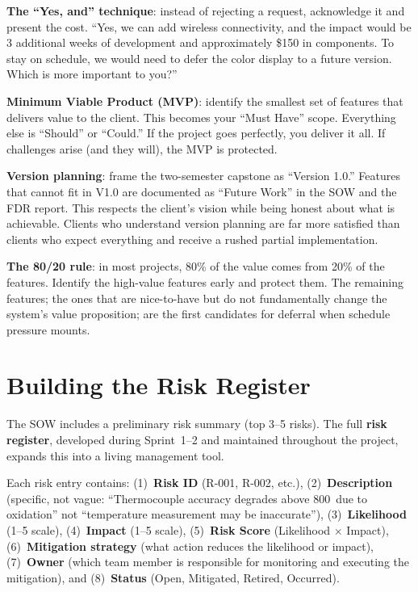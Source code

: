 \textbf{The ``Yes, and'' technique}: instead of rejecting a request, acknowledge it and present the cost. ``Yes, we can add wireless connectivity, and the impact would be 3 additional weeks of development and approximately \$150 in components. To stay on schedule, we would need to defer the color display to a future version. Which is more important to you?''

\textbf{Minimum Viable Product (MVP)}: identify the smallest set of features that delivers value to the client. This becomes your ``Must Have'' scope. Everything else is ``Should'' or ``Could.'' If the project goes perfectly, you deliver it all. If challenges arise (and they will), the MVP is protected.

\textbf{Version planning}: frame the two-semester capstone as ``Version 1.0.'' Features that cannot fit in V1.0 are documented as ``Future Work'' in the SOW and the FDR report. This respects the client's vision while being honest about what is achievable. Clients who understand version planning are far more satisfied than clients who expect everything and receive a rushed partial implementation.

\textbf{The 80/20 rule}: in most projects, 80\% of the value comes from 20\% of the features. Identify the high-value features early and protect them. The remaining features; the ones that are nice-to-have but do not fundamentally change the system's value proposition; are the first candidates for deferral when schedule pressure mounts.



\section{Building the Risk Register}
The SOW includes a preliminary risk summary (top 3--5 risks). The full \textbf{risk register}, developed during Sprint~1--2 and maintained throughout the project, expands this into a living management tool.

Each risk entry contains: (1)~\textbf{Risk ID} (R-001, R-002, etc.), (2)~\textbf{Description} (specific, not vague: ``Thermocouple accuracy degrades above 800\,\degC{} due to oxidation'' not ``temperature measurement may be inaccurate''), (3)~\textbf{Likelihood} (1--5 scale), (4)~\textbf{Impact} (1--5 scale), (5)~\textbf{Risk Score} (Likelihood $\times$ Impact), (6)~\textbf{Mitigation strategy} (what action reduces the likelihood or impact), (7)~\textbf{Owner} (which team member is responsible for monitoring and executing the mitigation), and (8)~\textbf{Status} (Open, Mitigated, Retired, Occurred).

